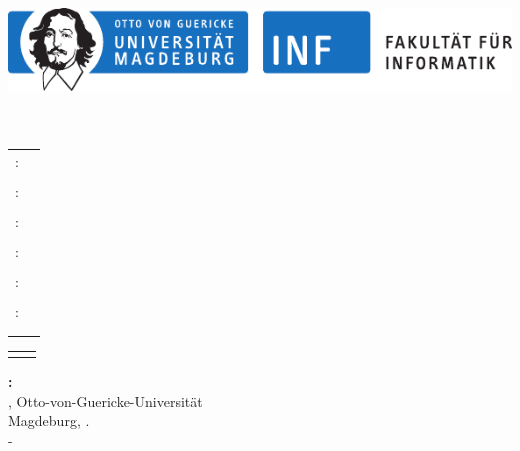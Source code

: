 \def\HAbst{0.5cm}
\begin{titlepage}
    \begin{flushleft}
        \begin{center}
            \includegraphics[width=14cm]{figures/signet/INF_SIGN_druck}
            {\large \myDepartment\\}
			\vspace{1.5cm}
			{\Large \myType \\[2cm]}
            {\Large \bf \myTitle\\[0.5cm]}
        \end{center}
    \vspace*{\fill}
	\large
	\begin{tabular}[t]{ll}
		\LangAuthor: 		&	\myAuthors	\\ & \\
		\LangProf:	&	\myProf		\\ & \\
		\LangTutor:	&	\myTutorA	\\ & \\
		\ifdefined\myTutorB
		\LangTutor:	&	\myTutorB	\\ & \\
		\fi
		\ifdefined\myTutorC
		\LangTutor:	&	\myTutorC	\\ & \\
		\fi
		\ifdefined\myTutorD
		\LangTutor:	&	\myTutorD	\\ & \\
		\fi
	\end{tabular}
	\vspace{1cm}
	\begin{tabular}{cc}
    	\myTerm & \myYear
	\end{tabular}
\end{flushleft}
\newpage
\vspace*{\fill}
\begin{minipage}[]{\textwidth-2cm}
  \textbf{\myAuthors: }\emph{\myTitle}\\
  \myType, Otto-von-Guericke-Universit\"at\\Magdeburg, \myYear.\\
	\myGroup - \myDepartment%
\end{minipage}
\end{titlepage}

\cleardoublepage
